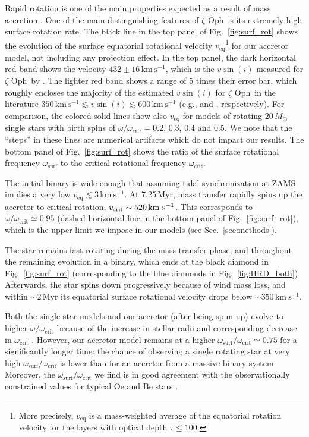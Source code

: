 \documentclass[twocolumn,twocolappendix,trackchanges]{aastex63}
\newcommand{\kms}{{\mathrm{km\ s^{-1}}}}
\DeclareRobustCommand{\Figref}[1]{Fig.~\ref{#1}}
\DeclareRobustCommand{\Secref}[1]{Sec.~\ref{#1}}
\newcommand{\zoph}{$\zeta$ Oph}
\begin{document}
Rapid rotation is one of the main properties expected as a result of
mass accretion \citep{packet:81}.  One of the main
distinguishing features of \zoph\ is its extremely high surface
rotation rate. The black line in the top panel of
\Figref{fig:surf_rot} shows the evolution of the surface equatorial
rotational velocity $v_\mathrm{eq}$\footnote{More precisely, $v_\mathrm{eq}$ is a
mass-weighted average of the equatorial rotation velocity for the layers with
optical depth $\tau\leq 100$.} for our accretor model, not
including any projection effect. In the top panel, the dark horizontal red band shows the velocity  $432\pm16\,\kms$, which is the $v \sin (i)$ measured for \zoph\ by \cite{zehe:18}. The lighter red band shows a range of 5 times their error bar, which
roughly encloses the majority of the estimated $v\sin(i)$ for \zoph\
in the literature $350\,\kms\lesssim v\sin(i)\lesssim 600\,\kms$
(e.g., \citealt{gordon:18} and \citealt{walker:79}, respectively).
For comparison, the colored solid lines show also $v_\mathrm{eq}$ for
models of rotating $20\,M_\odot$ single stars with birth spins of
$\omega/\omega_\mathrm{crit} = 0.2$, 0.3, 0.4 and 0.5. We note that
the ``steps'' in these lines are numerical artifacts which do not
impact our results. The bottom panel of \Figref{fig:surf_rot}
shows the ratio of the surface rotational frequency
$\omega_\mathrm{surf}$ to the critical rotational frequency
$\omega_\mathrm{crit}$.

The initial binary is wide enough that assuming tidal synchronization
at ZAMS implies a very low $v_\mathrm{eq}\lesssim 3\,\kms$. At 7.25\,Myr, mass transfer rapidly spins
up the accretor to critical rotation,
$v_{\rm crit}\sim{}520\,\kms$. This corresponds to
$\omega/\omega_\mathrm{crit}\simeq 0.95$ (dashed horizontal line in
the bottom panel of \Figref{fig:surf_rot}), which is the upper-limit
we impose in our models (see \Secref{sec:methods}).

The star remains fast rotating during the mass transfer phase, and throughout
the remaining evolution in a binary, which ends at the black diamond in
\Figref{fig:surf_rot} (corresponding to the blue diamonds in
\Figref{fig:HRD_both}). Afterwards, the star spins
down progressively because of wind mass loss, and within $\sim$2\,Myr its
equatorial surface rotational velocity drops below $\sim{}350\,\kms$.

Both the single star models and our accretor (after being spun up)
evolve to higher $\omega/\omega_\mathrm{crit}$ because of the increase
in stellar radii and corresponding decrease in $\omega_\mathrm{crit}$
\citep[e.g.,][]{langer:98, zhao:20}. However, our accretor model
remains at a higher
$\omega_\mathrm{surf}/\omega_\mathrm{crit}\simeq 0.75$ for a
significantly longer time: the chance of observing a single rotating
star at very high $\omega_\mathrm{surf}/\omega_\mathrm{crit}$ is lower
than for an accretor from a massive binary system. Moreover,
the $\omega_\mathrm{surf}/\omega_\mathrm{crit}$ we find is in good
agreement with the observationally constrained values for typical Oe
and Be stars \citep[see][for a review]{rivinius:13}.
\end{document}

